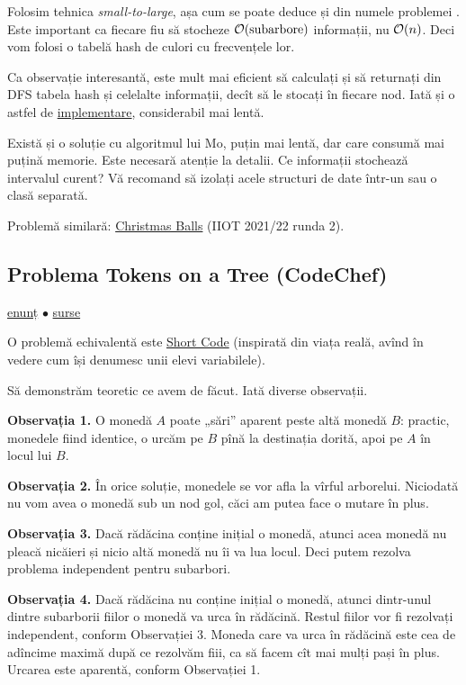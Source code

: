 \documentclass[../main.tex]{subfiles}
\begin{document}
Folosim tehnica \textit{small-to-large}, așa cum se poate deduce și din numele problemei . Este important ca fiecare fiu să stocheze $\mathcal{O}(\text{subarbore})$ informații, nu $\mathcal{O}(n)$. Deci vom folosi o tabelă hash de culori cu frecvențele lor.

Ca observație interesantă, este mult mai eficient să calculați și să returnați din DFS tabela hash și celelalte informații, decît să le stocați în fiecare nod. Iată și o astfel de \href{https://codeforces.com/contest/600/submission/232610323}{implementare}, considerabil mai lentă.

Există și o soluție cu algoritmul lui Mo, puțin mai lentă, dar care consumă mai puțină memorie. Este necesară atenție la detalii. Ce informații stochează intervalul curent? Vă recomand să izolați acele structuri de date într-un  sau o clasă separată.

Problemă similară: \href{https://kilonova.ro/problems/958}{Christmas Balls} (IIOT 2021/22 runda 2).

\subsection{Problema Tokens on a Tree (CodeChef)}
\label{problem:tokens-on-a-tree}

\href{https://www.codechef.com/problems/TRTOKENS}{enunț}
$\bullet$
\hyperref[code:tokens-on-a-tree]{surse}

O problemă echivalentă este \href{https://codeforces.com/contest/965/problem/E}{Short Code} (inspirată din viața reală, avînd în vedere cum își denumesc unii elevi variabilele).

Să demonstrăm teoretic ce avem de făcut. Iată diverse observații.

\textbf{Observația 1.} O monedă $A$ poate „sări” aparent peste altă monedă $B$: practic, monedele fiind identice, o urcăm pe $B$ pînă la destinația dorită, apoi pe $A$ în locul lui $B$.

\textbf{Observația 2.} În orice soluție, monedele se vor afla la vîrful arborelui. Niciodată nu vom avea o monedă sub un nod gol, căci am putea face o mutare în plus.

\textbf{Observația 3.} Dacă rădăcina conține inițial o monedă, atunci acea monedă nu pleacă nicăieri și nicio altă monedă nu îi va lua locul. Deci putem rezolva problema independent pentru subarbori.

\textbf{Observația 4.} Dacă rădăcina nu conține inițial o monedă, atunci dintr-unul dintre subarborii fiilor o monedă va urca în rădăcină. Restul fiilor vor fi rezolvați independent, conform Observației 3. Moneda care va urca în rădăcină este cea de adîncime maximă după ce rezolvăm fiii, ca să facem cît mai mulți pași în plus. Urcarea este aparentă, conform Observației 1.
\end{document}
